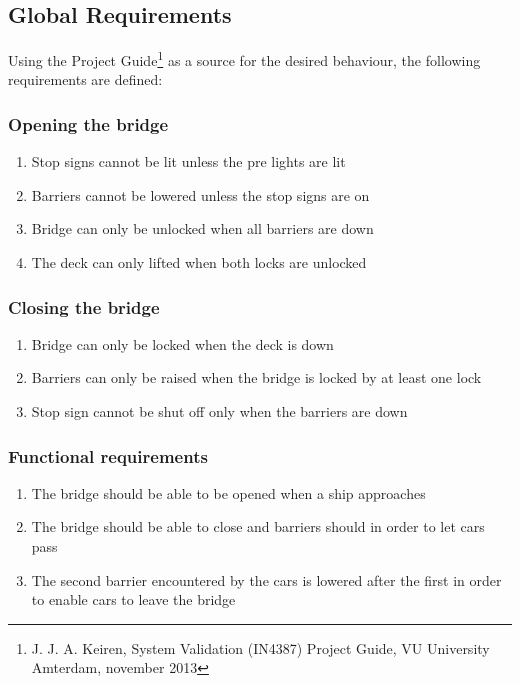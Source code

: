 \subsection{Global Requirements}
\label{sec:glob}

Using the Project Guide\footnote{J. J. A. Keiren, System Validation (IN4387)
Project Guide, VU University Amterdam, november 2013} as a source for the
desired behaviour, the following requirements are defined:

\subsubsection*{Opening the bridge}
\begin{enumerate}
	\item Stop signs cannot be lit unless the pre lights are lit
	\item Barriers cannot be lowered unless the stop signs are on
	\item Bridge can only be unlocked when all barriers are down
	\item The deck can only lifted when both locks are unlocked
	\setcounter{enumTemp}{\theenumi}
\end{enumerate}

\subsubsection*{Closing the bridge}
\begin{enumerate}
	\setcounter{enumi}{\theenumTemp}
	\item Bridge can only be locked when the deck is down
	\item Barriers can only be raised when the bridge is locked by at least one
	      lock
	\item Stop sign cannot be shut off only when the barriers are down
	\setcounter{enumTemp}{\theenumi}
\end{enumerate}

\subsubsection*{Functional requirements}
\begin{enumerate}
	\setcounter{enumi}{\theenumTemp}
	\item The bridge should be able to be opened when a ship approaches
	\item The bridge should be able to close and barriers should in order to
	      let cars pass
	\item The second barrier encountered by the cars is lowered after
	      the first in order to enable cars to leave the bridge
	\setcounter{enumTemp}{\theenumi}
\end{enumerate}

